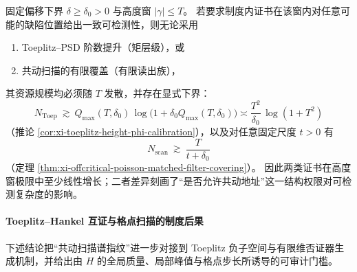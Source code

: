 \begin{proposition}\label{con:xi-toeplitz-vs-scan-complexity-lower-bounds}
固定偏移下界 \(\delta\ge\delta_0>0\) 与高度窗 \(|\gamma|\le T\)。
若要求制度内证书在该窗内对任意可能的缺陷位置给出一致可检测性，则无论采用
\begin{enumerate}
  \item Toeplitz--PSD 阶数提升（矩层级），或
  \item 共动扫描的有限覆盖（有限读出族），
\end{enumerate}
其资源规模均必须随 \(T\) 发散，并存在显式下界：
\[
N_{\mathrm{Toep}}\ \gtrsim\ Q_{\max}(T,\delta_0)\,\log\!\bigl(1+\delta_0 Q_{\max}(T,\delta_0)\bigr)
\asymp \frac{T^2}{\delta_0}\,\log(1+T^2)
\]
（推论 \ref{cor:xi-toeplitz-height-phi-calibration}），以及对任意固定尺度 \(t>0\) 有
\[
N_{\mathrm{scan}}\ \gtrsim\ \frac{T}{t+\delta_0}
\]
（定理 \ref{thm:xi-offcritical-poisson-matched-filter-covering}）。
因此两类证书在高度窗极限中至少线性增长；二者差异刻画了“是否允许共动地址”这一结构权限对可检测复杂度的影响。
\end{proposition}

\paragraph{Toeplitz--Hankel 互证与格点扫描的制度后果}
下述结论把“共动扫描谱指纹”进一步对接到 Toeplitz 负子空间与有限维否证器生成机制，并给出由 \(H\) 的全局质量、局部峰值与格点步长所诱导的可审计门槛。

